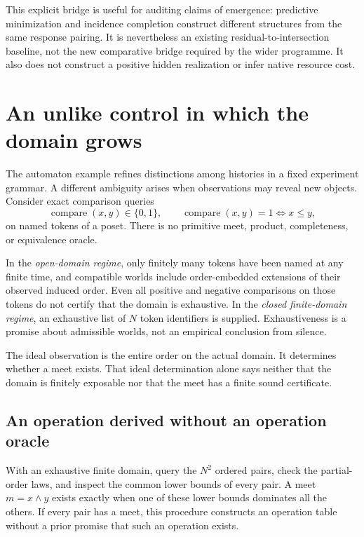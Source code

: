 \documentclass[11pt]{article}
\theoremstyle{remark}
\begin{document}
This explicit bridge is useful for auditing claims of emergence: predictive minimization and incidence completion construct different structures from the same response pairing. It is nevertheless an existing residual-to-intersection baseline, not the new comparative bridge required by the wider programme. It also does not construct a positive hidden realization or infer native resource cost.

\section{An unlike control in which the domain grows}
\label{sec:poset}

The automaton example refines distinctions among histories in a fixed experiment grammar. A different ambiguity arises when observations may reveal new objects. Consider exact comparison queries
\[
 \operatorname{compare}(x,y)\in\{0,1\},
 \qquad \operatorname{compare}(x,y)=1\Longleftrightarrow x\le y,
\]
on named tokens of a poset. There is no primitive meet, product, completeness, or equivalence oracle.

In the \emph{open-domain regime}, only finitely many tokens have been named at any finite time, and compatible worlds include order-embedded extensions of their observed induced order. Even all positive and negative comparisons on those tokens do not certify that the domain is exhaustive. In the \emph{closed finite-domain regime}, an exhaustive list of $N$ token identifiers is supplied. Exhaustiveness is a promise about admissible worlds, not an empirical conclusion from silence.

The ideal observation is the entire order on the actual domain. It determines whether a meet exists. That ideal determination alone says neither that the domain is finitely exposable nor that the meet has a finite sound certificate.

\subsection{An operation derived without an operation oracle}

With an exhaustive finite domain, query the $N^2$ ordered pairs, check the partial-order laws, and inspect the common lower bounds of every pair. A meet $m=x\wedge y$ exists exactly when one of these lower bounds dominates all the others. If every pair has a meet, this procedure constructs an operation table without a prior promise that such an operation exists.
\end{document}
